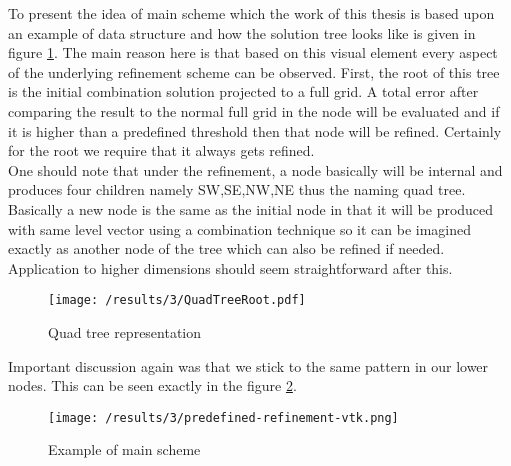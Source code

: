  To present the idea of main scheme which the work of this thesis is based upon an example of data structure and how the solution tree looks like is given in figure \ref{fig:QuadTreeRoot1}. The main reason here is that based on this visual element every aspect of the underlying refinement scheme can be observed. First, the root of this tree is the initial combination solution projected to a full grid. A total error after comparing the result to the normal full grid in the node will be evaluated and if it is higher than a predefined threshold then that node will be refined. Certainly for the root we require that it always gets refined. \\
 One should note that under the refinement, a node basically will be internal and produces four children namely SW,SE,NW,NE thus the naming quad tree. Basically a new node is the same as the initial node in that it will be produced with same level vector using a combination technique so it can be imagined exactly as another node of the tree which can also be refined if needed. Application to higher dimensions should seem straightforward after this.\\
 
 \begin{figure}[h]
	\centering
	    \texttt{[image: /results/3/QuadTreeRoot.pdf]}
		\centering
        \caption{Quad tree representation}
        \label{fig:QuadTreeRoot1}
\end{figure}

 Important discussion again was that we stick to the same pattern in our lower nodes. This can be seen exactly in the figure \ref{fig:Predef2}.
 
\begin{figure}[!ht]
	\centering
	    \texttt{[image: /results/3/predefined-refinement-vtk.png]}
    \caption{Example of main scheme}
    \label{fig:Predef2}
\end{figure}
 


